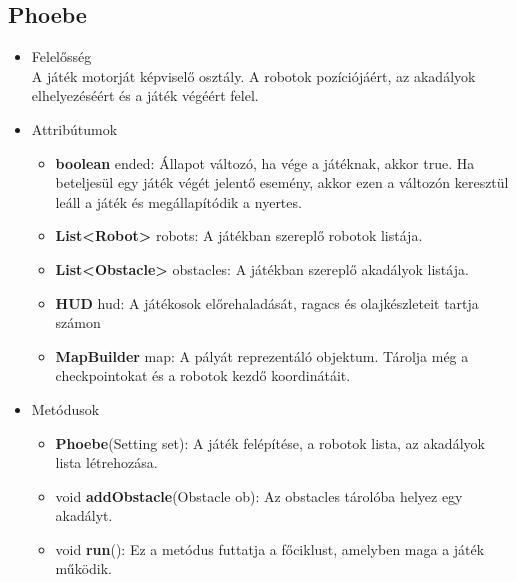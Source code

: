\subsection{Phoebe}
\begin{itemize}
\item Felelősség\\
A játék motorját képviselő osztály. A robotok pozíciójáért, az akadályok elhelyezéséért és a játék végéért felel.
\item Attribútumok
	\begin{itemize}
		\item \textbf{boolean} ended: Állapot változó, ha vége a játéknak, akkor true. Ha beteljesül egy játék végét jelentő esemény, akkor ezen a változón keresztül leáll a játék és megállapítódik a nyertes.
		\item \textbf{List<Robot>} robots: A játékban szereplő robotok listája.
		\item \textbf{List<Obstacle>} obstacles: A játékban szereplő akadályok listája.
		\item \textbf{HUD} hud: A játékosok előrehaladását, ragacs és olajkészleteit tartja számon
		\item \textbf{MapBuilder} map: A pályát reprezentáló objektum. Tárolja még a checkpointokat és a robotok kezdő koordinátáit.
	\end{itemize}
\item Metódusok
	\begin{itemize}
		\item \textbf{Phoebe}(Setting set): A játék felépítése, a robotok lista, az akadályok lista létrehozása.
		\item void \textbf{addObstacle}(Obstacle ob): Az obstacles tárolóba helyez egy akadályt.
		\item void \textbf{run}(): Ez a metódus futtatja a főciklust, amelyben maga a játék működik.
	\end{itemize}
\end{itemize}

